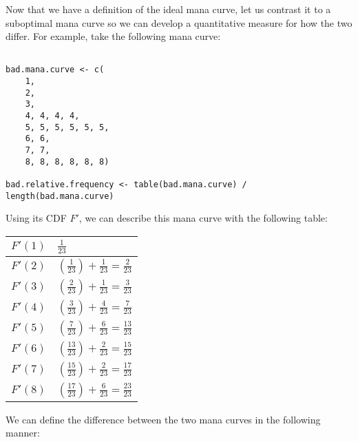 \documentclass[12pt, letterpaper]{article}
\begin{document}
Now that we have a definition of the ideal mana curve,
let us contrast it to a suboptimal mana curve
so we can develop a quantitative measure for how the two differ.
For example, take the following mana curve:


\begin{verbatim}

bad.mana.curve <- c(
    1,
    2,
    3,
    4, 4, 4, 4,
    5, 5, 5, 5, 5, 5,
    6, 6,
    7, 7,
    8, 8, 8, 8, 8, 8)

bad.relative.frequency <- table(bad.mana.curve) / length(bad.mana.curve)

\end{verbatim}

Using its CDF $ F' $, we can describe this mana curve with the following table:

\begin{tabular}{|l|l|}
\hline

$ F'(1) $ & $ \frac{1}{23} $ \\ \hline
$ F'(2) $ & $ (\frac{1}{23}) + \frac{1}{23} = \frac{2}{23} $ \\ \hline
$ F'(3) $ & $ (\frac{2}{23}) + \frac{1}{23} = \frac{3}{23} $ \\ \hline
$ F'(4) $ & $ (\frac{3}{23}) + \frac{4}{23} = \frac{7}{23} $ \\ \hline
$ F'(5) $ & $ (\frac{7}{23}) + \frac{6}{23} = \frac{13}{23} $ \\ \hline
$ F'(6) $ & $ (\frac{13}{23}) + \frac{2}{23} = \frac{15}{23} $ \\ \hline
$ F'(7) $ & $ (\frac{15}{23}) + \frac{2}{23} = \frac{17}{23} $ \\ \hline
$ F'(8) $ & $ (\frac{17}{23}) + \frac{6}{23} = \frac{23}{23} $ \\ \hline

\end{tabular}

We can define the difference between the two mana curves in the following manner:
\end{document}
